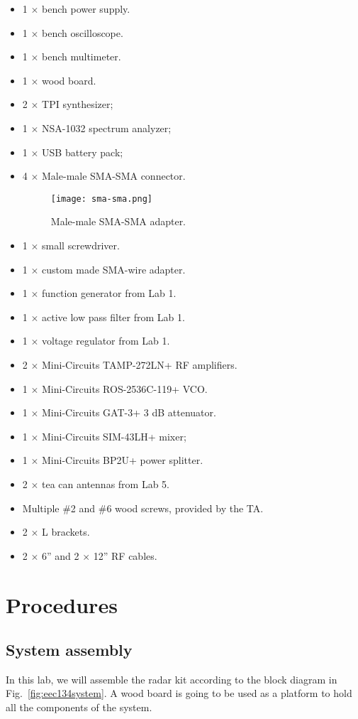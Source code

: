 \documentclass[letterpaper, 11pt]{article}
\begin{document}
\begin{itemize}[itemsep=0.5ex]
	\item 1 $\times$ bench power supply.
	\item 1 $\times$ bench oscilloscope.
	\item 1 $\times$ bench multimeter.
	\item 1 $\times$ wood board.
	\item 2 $\times$ TPI synthesizer;
	\item 1 $\times$ NSA-1032 spectrum analyzer;
	\item 1 $\times$ USB battery pack;
	\item 4 $\times$ Male-male SMA-SMA connector. 
		\begin{figure}[h]
			\centering
			\texttt{[image: sma-sma.png]} 
			\caption{Male-male SMA-SMA adapter.}
			\label{fig:sma-sma}
		\end{figure}
	\item 1 $\times$ small screwdriver.
	\item 1 $\times$ custom made SMA-wire adapter.
	\item 1 $\times$ function generator from Lab 1.
	\item 1 $\times$ active low pass filter from Lab 1. 
	\item 1 $\times$ voltage regulator from Lab 1.
	\item 2 $\times$ Mini-Circuits TAMP-272LN+ RF amplifiers. 
	\item 1 $\times$ Mini-Circuits ROS-2536C-119+ VCO. 
	\item 1 $\times$ Mini-Circuits GAT-3+ 3 dB attenuator. 
	\item 1 $\times$ Mini-Circuits SIM-43LH+ mixer;
	\item 1 $\times$ Mini-Circuits BP2U+ power splitter. 
	\item 2 $\times$ tea can antennas from Lab 5.
	\item Multiple \#2 and \#6 wood screws, provided by the TA. 
	\item 2 $\times$ L brackets. 
	\item 2 $\times$ 6'' and 2 $\times$ 12'' RF cables.
\end{itemize}

\newpage
\section{Procedures}

\subsection{System assembly}
In this lab, we will assemble the radar kit according to the block diagram in Fig.~\ref{fig:eec134system}. A wood board is going to be used as a platform to hold all the components of the system.
\end{document}
